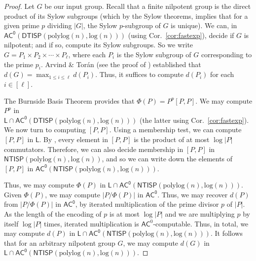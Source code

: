 \documentclass{article}
\newcommand{\Cor}[1]{Cor.~\ref{#1}\xspace}
\newcommand*{\ComplexityClass}[1]{\ensuremath{\mathsf{#1}}\xspace}
\newcommand{\NTISP}{\ComplexityClass{NTISP}}
\newcommand{\DTISP}{\ComplexityClass{DTISP}}
\newcommand{\NTISPpll}{\ensuremath{\NTISP(\mathrm{polylog}(n),\mathrm{log}(n))}\xspace}
\newcommand{\DTISPpll}{\ensuremath{\DTISP(\mathrm{polylog}(n),\mathrm{log}(n))}\xspace}
\newcommand*{\LogSpace}{\ComplexityClass{L}}
\newcommand{\AC}{\ComplexityClass{AC}}
\newcommand{\ACz}{\ComplexityClass{AC^0}}
\begin{document}
\begin{proof}
Let $G$ be our input group. Recall that a finite nilpotent group is the direct product of its Sylow subgroups (which by the Sylow theorems, implies that for a given prime $p$ dividing $|G|$, the Sylow $p$-subgroup of $G$ is unique). We can, in $\ACz(\DTISPpll)$ (using \Cor{cor:fastexp}), decide if $G$ is nilpotent; and if so, compute its Sylow subgroups. So we write $G = P_{1} \times P_{2} \times \cdots \times P_{\ell}$, where each $P_{i}$ is the Sylow subgroup of $G$ corresponding to the prime $p_{i}$. Arvind \& Tor\'an (see the proof of \cite[Theorem~7]{ArvindToran}) established that $d(G) = \max_{1 \leq i \leq \ell} d(P_{i})$. Thus, it suffices to compute $d(P_{i})$ for each $i \in [\ell]$.

The Burnside Basis Theorem provides that $\Phi(P) = P^{p}[P,P]$. We may compute $P^{p}$ in \\$\LogSpace \cap \ACz(\DTISPpll)$ (the latter using \Cor{cor:fastexp}). We now turn to computing $[P,P]$.
Using a membership test, we can compute $[P,P]$ in $\LogSpace$.
By \cite[I.§4~Exercise~5]{Serre}, every element in $[P,P]$ is the product of at most $\log |P|$ commutators. 
Therefore, we can also decide membership in $[P,P]$ in $\NTISPpll$, and so we can write down the elements of $[P,P]$ in $\ACz(\NTISPpll)$.

Thus, we may compute $\Phi(P)$ in $\LogSpace \cap \ACz(\NTISPpll)$. Given $\Phi(P)$, we may compute $|P/\Phi(P)|$ in $\ACz$. Thus, we may recover $d(P)$ from $|P/\Phi(P)|$ in $\ACz$, by iterated multiplication of the prime divisor $p$ of $|P|$. As the length of the encoding of $p$ is at most $\log |P|$ and we are multiplying $p$ by itself $\log |P|$ times, iterated multiplication is $\AC^{0}$-computable. Thus, in total, we may compute $d(P)$ in $\LogSpace \cap \ACz(\NTISPpll)$. It follows that for an arbitrary nilpotent group $G$, we may compute $d(G)$ in $\LogSpace \cap \ACz(\NTISPpll)$. 
\end{proof}
\end{document}
